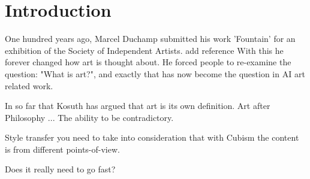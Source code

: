 \chapter*{Introduction}
\label{chap:intro}

One hundred years ago, Marcel Duchamp submitted his work 'Fountain' for an exhibition of the Society of Independent Artists. {add reference}
With this he forever changed how art is thought about. He forced people to re-examine the question: "What is art?", and exactly that has now become the question in AI art related work.

In so far that Kosuth has argued that art is its own definition. {Art after Philosophy}
...
The ability to be contradictory.

Style transfer you need to take into consideration that with Cubism the content is from different points-of-view.

Does it really need to go fast?